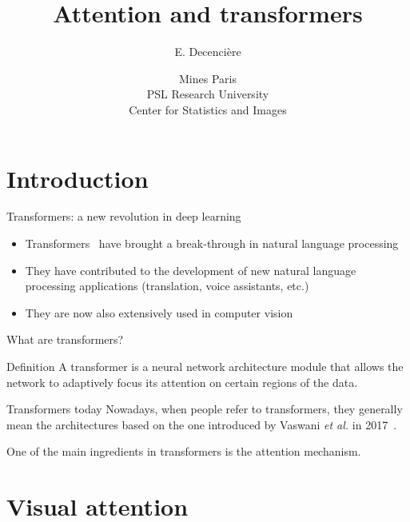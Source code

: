 \documentclass[xcolor=pdftex,dvipsnames,table,mathserif,aspectratio=169]{beamer}
\title{Attention and transformers}
\author{E. Decencière}
\date{Mines Paris\\
  PSL Research University\\
  Center for Statistics and Images
}
\begin{document}
\frame{\titlepage}


\section{Introduction}


\begin{frame}{Transformers: a new revolution in deep learning}

\begin{itemize}
\item Transformers~\cite{vaswani_attention_2017} have brought a break-through in natural language processing
  \item They have contributed to the development of new natural language processing applications (translation, voice assistants, etc.)
  \item They are now also extensively used in computer vision
\end{itemize}

\end{frame}


\begin{frame}{What are transformers?}

\begin{block}{Definition}
A transformer is a neural network architecture module that allows the network to \alert{adaptively focus its attention} on certain regions of the data.
\end{block}

\pause

\begin{alertblock}{Transformers today}
  Nowadays, when people refer to transformers, they generally mean the architectures based on the one introduced by Vaswani \textit{et al.} in 2017~\cite{vaswani_attention_2017}.
\end{alertblock}

\pause

One of the main ingredients in transformers is the attention mechanism.

\end{frame}


\section{Visual attention}
\end{document}
